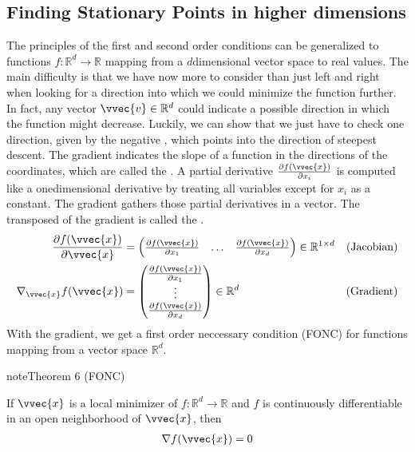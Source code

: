 \documentclass[letterpaper,10pt,english]{jupyterBook}
\begin{document}
\subsection{Finding Stationary Points in higher dimensions}
\label{\detokenize{optimization_analytic:finding-stationary-points-in-higher-dimensions}}
\sphinxAtStartPar
The principles of the first and second order conditions can be generalized to functions \(f:\mathbb{R}^d\rightarrow \mathbb{R}\) mapping from a \(d\)\sphinxhyphen{}dimensional vector space to real values. The main difficulty is that we have now more to consider than just left and right when looking for a direction into which we could minimize the function further. In fact, any vector \(\vvec{v}\in\mathbb{R}^d\) could indicate a possible direction in which the function might decrease. Luckily, we can show that we just have to check one direction, given by the negative , which points into the direction of steepest descent. The gradient indicates the slope of a function in the directions of the coordinates, which are called the . A partial derivative \(\frac{\partial f(\vvec{x})}{\partial x_i}\) is computed like a one\sphinxhyphen{}dimensional derivative by treating all variables except for \(x_i\) as  a constant. The gradient gathers those partial derivatives in a vector. The transposed of the gradient is called the .
\begin{align*}
    \frac{\partial f(\vvec{x})}{\partial \vvec{x}} &=
    \begin{pmatrix}
    \frac{\partial f(\vvec{x})}{\partial x_1} & \ldots & \frac{\partial f(\vvec{x})}{\partial x_d}
    \end{pmatrix}\in\mathbb{R}^{1\times d} &\text{(Jacobian)}\\
      \nabla_\vvec{x} f(\vvec{x}) &=
    \begin{pmatrix}
    \frac{\partial f(\vvec{x})}{\partial x_1} \\ \vdots \\ \frac{\partial f(\vvec{x})}{\partial x_d}
    \end{pmatrix}\in\mathbb{R}^{d} &\text{(Gradient)}
\end{align*}
\sphinxAtStartPar
With the gradient, we get a first order neccessary condition (FONC) for functions mapping from a vector space \(\mathbb{R}^d\).
\label{optimization_analytic:theorem-1}
\begin{sphinxadmonition}{note}{Theorem 6 (FONC)}



\sphinxAtStartPar
If \(\vvec{x}\) is a local  minimizer of \(f:\mathbb{R}^d\rightarrow\mathbb{R}\) and \(f\) is continuously
differentiable in an open neighborhood of \(\vvec{x}\), then
\begin{equation*}
\begin{split}\nabla f(\vvec{x})=0\end{split}
\end{equation*}
\end{sphinxadmonition}
\end{document}
